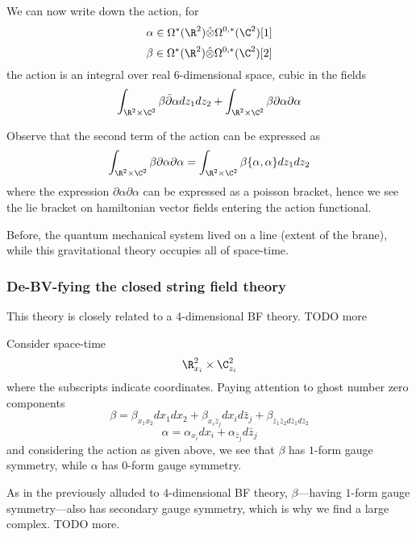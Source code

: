 \documentclass[12pt]{amsart}
\begin{document}
We can now write down the action, for $$\alpha \in
\Omega^*(\R^2)\hat{\otimes}\Omega^{0,*}(\C^2)[1]$$
$$\beta \in \Omega^*(\R^2)\hat{\otimes}\Omega^{0,*}(\C^2)[2]$$
the action is an integral over real 6-dimensional space, cubic in the fields
$$\int_{\R^2 \times \C^2} \beta\bar{\partial}\alpha dz_1 dz_2 +
\int_{\R^2\times \C^2} \beta \partial \alpha \partial \alpha$$

\begin{rmk}
  Observe that the second term of the action can be expressed as
  $$\int_{\R^2\times \C^2} \beta \partial \alpha \partial \alpha =
  \int_{\R^2\times \C^2} \beta\{\alpha,\alpha\}dz_1 dz_2$$
  where the expression $\partial \alpha \partial \alpha$ can be expressed as a
  poisson bracket, hence we see the lie bracket on hamiltonian vector fields
  entering the action functional.
\end{rmk}

\begin{rmk}
  Before, the quantum mechanical system lived on a line (extent of the brane), while this gravitational theory occupies all of space-time.
\end{rmk}

\subsubsection{De-BV-fying the closed string field theory}

\begin{rmk}
  This theory is closely related to a 4-dimensional BF theory.
  TODO more
\end{rmk}

Consider space-time $$\R^2_{x_i}\times\C^2_{z_i}$$ where the subscripts
indicate coordinates. Paying attention to ghost number zero components
$$\beta = \beta_{x_1 x_2} dx_1 dx_2 + \beta_{x_i \bar{z}_j} dx_i d\bar{z}_j +
\beta_{\bar{z}_1\bar{z}_2 d\bar{z}_1d\bar{z}_2}$$
$$\alpha = \alpha_{x_i}dx_i + \alpha_{\bar{z}_j}d\bar{z}_j$$
and considering the action as given above, we see that $\beta$ has $1$-form gauge
symmetry, while $\alpha$ has $0$-form gauge symmetry.
\begin{rmk}
  As in the previously alluded to $4$-dimensional BF theory, $\beta$---having
  $1$-form gauge symmetry---also has secondary gauge symmetry, which is why we
  find a large complex. TODO more.
\end{rmk}
\end{document}
